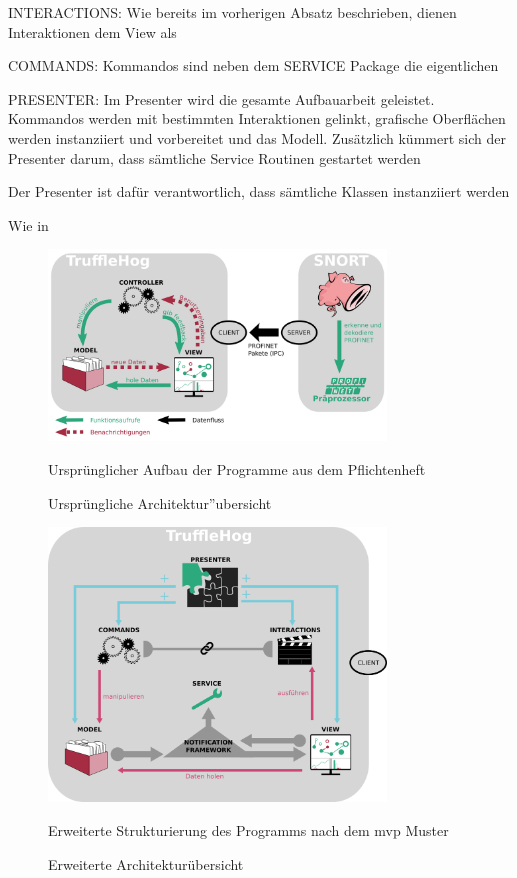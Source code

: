 INTERACTIONS:
Wie bereits im vorherigen Absatz beschrieben, dienen Interaktionen dem View als 

COMMANDS:
Kommandos sind neben dem SERVICE Package die eigentlichen 

PRESENTER:
Im Presenter wird die gesamte Aufbauarbeit geleistet. Kommandos werden mit bestimmten Interaktionen gelinkt, grafische Oberflächen werden instanziiert und vorbereitet und das Modell.
Zusätzlich kümmert sich der Presenter darum, dass sämtliche Service Routinen gestartet werden 


Der Presenter ist dafür verantwortlich, dass sämtliche Klassen instanziiert werden 

Wie  in 


\begin{figure}[H]
  \centering
  \includegraphics[width=0.8\textwidth]{../diagramimages/praesentationsmodel.png}
  \caption[Ursprüngliche Architektur''ubersicht]{Ursprüngliche Architektur''ubersicht}
  \medskip
  Ursprünglicher Aufbau der Programme aus dem Pflichtenheft
\end{figure} 

\begin{figure}[H]
  \centering
  \includegraphics[width=0.8\textwidth]{../diagramimages/arch_diagram_mvp_test.png}
  \caption[Erweiterte Architekturübersicht]{Erweiterte Architekturübersicht}
  \medskip
  Erweiterte Strukturierung des Programms nach dem \gls{mvp} Muster
\end{figure} 